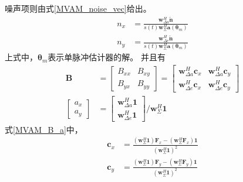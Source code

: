 \documentclass[master]{thesis-uestc}
\begin{document}
噪声项则由式\eqref{MVAM_noise_vec}给出。
\begin{subequations}\label{MVAM_noise_vec}
    \begin{align}
        n_x &= \frac{\bm{w}^H_{\Delta a}\tilde{\bm{n}}}{s(t)\bm{w}^H_\Sigma\bm{a}(\bm{\theta}_m)} \\
        n_y &= \frac{\bm{w}^H_{\Delta e}\tilde{\bm{n}}}{s(t)\bm{w}^H_\Sigma\bm{a}(\bm{\theta}_m)}
    \end{align}
\end{subequations}
上式中，$\bm{\theta}_m$表示单脉冲估计器的解。
并且有
\begin{subequations}\label{MVAM_B_a}
    \begin{align}
        \bm{B} &= 
        \begin{bmatrix}
            B_{xx} & B_{xy} \\
            B_{yx} & B_{yy}
        \end{bmatrix} = 
        \begin{bmatrix}
            \bm{w}^H_{\Delta a}\bm{c}_x & \bm{w}^H_{\Delta a}\bm{c}_y \\
            \bm{w}^H_{\Delta e}\bm{c}_x & \bm{w}^H_{\Delta e}\bm{c}_y
        \end{bmatrix} \\
        \begin{bmatrix}
            a_x \\ a_y
        \end{bmatrix}
        &=
        \begin{bmatrix}
            \bm{w}^H_{\Delta a}\textbf{1} \\ \bm{w}^H_{\Delta e}\textbf{1}
        \end{bmatrix} / \bm{w}^H_\Sigma\textbf{1}
    \end{align}
\end{subequations}
式\eqref{MVAM_B_a}中，
\begin{subequations}\label{MVAM_c_vec}
    \begin{align}
        \bm{c}_x &= \frac{\left(\bm{w}^H_\Sigma\textbf{1}\right)\bm{F}_x-
                            \left(\bm{w}^H_\Sigma\bm{F}_x\right)\textbf{1}}
                         {\left(\bm{w}^H_\Sigma\textbf{1}\right)^2} \\
        \bm{c}_y &= \frac{\left(\bm{w}^H_\Sigma\textbf{1}\right)\bm{F}_y-
                            \left(\bm{w}^H_\Sigma\bm{F}_y\right)\textbf{1}}
                         {\left(\bm{w}^H_\Sigma\textbf{1}\right)^2} \\
    \end{align}
\end{subequations}
\end{document}
